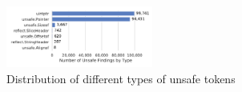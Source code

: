 \begin{figure}[!t]
    \centering
    \includegraphics[width=0.43\textwidth]{assets/plots/distribution-unsafe-types.pdf}
    \caption{Distribution of different types of unsafe tokens}
    \label{fig:unsafe-tokens-distribution}
\end{figure}